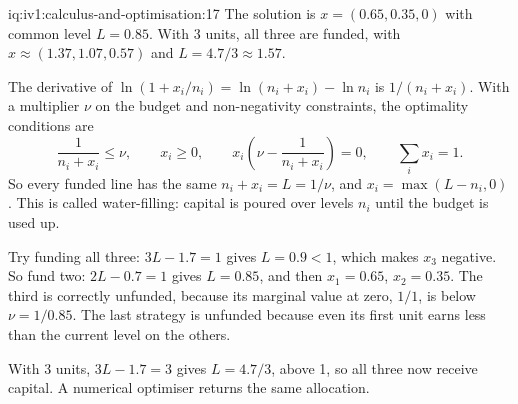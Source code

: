 \begin{solution}{iq:iv1:calculus-and-optimisation:17}
The solution is $x = (0.65, 0.35, 0)$ with common level $L = 0.85$. With 3 units, all three are funded, with $x \approx (1.37, 1.07, 0.57)$ and $L = 4.7/3 \approx 1.57$.

The derivative of $\ln(1 + x_i/n_i) = \ln(n_i + x_i) - \ln n_i$ is $1/(n_i + x_i)$. With a multiplier $\nu$ on the budget and non-negativity constraints, the optimality conditions are
\[
\frac{1}{n_i + x_i} \le \nu, \qquad x_i \ge 0, \qquad x_i\left(\nu - \frac{1}{n_i + x_i}\right) = 0, \qquad \sum_i x_i = 1.
\]
So every funded line has the same $n_i + x_i = L = 1/\nu$, and $x_i = \max(L - n_i, 0)$. This is called water-filling: capital is poured over levels $n_i$ until the budget is used up.

Try funding all three: $3L - 1.7 = 1$ gives $L = 0.9 < 1$, which makes $x_3$ negative. So fund two: $2L - 0.7 = 1$ gives $L = 0.85$, and then $x_1 = 0.65$, $x_2 = 0.35$. The third is correctly unfunded, because its marginal value at zero, $1/1$, is below $\nu = 1/0.85$. The last strategy is unfunded because even its first unit earns less than the current level on the others.

With 3 units, $3L - 1.7 = 3$ gives $L = 4.7/3$, above 1, so all three now receive capital. A numerical optimiser returns the same allocation.



\end{solution}

